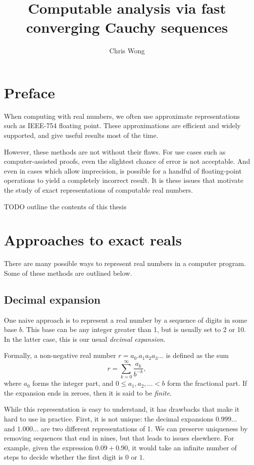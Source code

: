 \documentclass[leqno]{report}
\begin{document}
\author{Chris Wong}
\title{Computable analysis via fast converging Cauchy sequences}
\maketitle

\chapter*{Preface}

When computing with real numbers, we often use approximate representations such as IEEE-754 floating point. These approximations are efficient and widely supported, and give useful results most of the time.

However, these methods are not without their flaws. For use cases such as computer-assisted proofs, even the slightest chance of error is not acceptable. And even in cases which allow imprecision, is possible for a handful of floating-point operations to yield a completely incorrect result. It is these issues that motivate the study of exact representations of computable real numbers.

TODO outline the contents of this thesis

\chapter{Approaches to exact reals}

There are many possible ways to represent real numbers in a computer program. Some of these methods are outlined below.

\section{Decimal expansion}

One naive approach is to represent a real number by a sequence of digits in some base $b$. This base can be any integer greater than 1, but is usually set to 2 or 10. In the latter case, this is our usual \textit{decimal expansion}.

Formally, a non-negative real number $r = a_0 . a_1 a_2 a_3 \ldots$ is defined as the sum
\[
    r = \sum_{k=0}^\infty \frac{a_k}{b^{-k}},
\]
where $a_0$ forms the integer part, and $0 \leq a_1, a_2, \ldots < b$ form the fractional part. If the expansion ends in zeroes, then it is said to be \textit{finite}.

While this representation is easy to understand, it has drawbacks that make it hard to use in practice. First, it is not unique: the decimal expansions $0.999\ldots$ and $1.000\ldots$ are two different representations of 1. We can preserve uniqueness by removing sequences that end in nines, but that leads to issues elsewhere. For example, given the expression $0.\overline{09} + 0.\overline{90}$, it would take an infinite number of steps to decide whether the first digit is $0$ or $1$.
\end{document}

